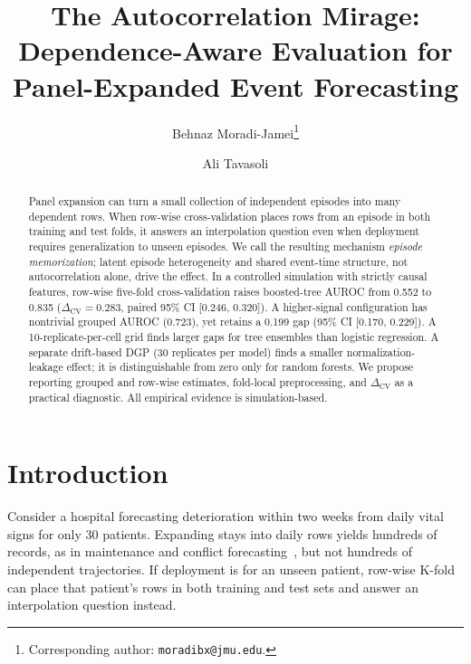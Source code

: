 \documentclass[runningheads]{llncs}
\newcommand{\1}{\mathbf{1}}
\newcommand{\DeltaCV}{\Delta_{\text{CV}}}
\begin{document}
\title{The Autocorrelation Mirage: Dependence-Aware Evaluation for Panel-Expanded Event Forecasting}

\author{Behnaz Moradi-Jamei\thanks{Corresponding author: \texttt{moradibx@jmu.edu}.} \and Ali Tavasoli}

\maketitle

\begin{abstract}
Panel expansion can turn a small collection of independent episodes into many dependent rows. When row-wise cross-validation places rows from an episode in both training and test folds, it answers an interpolation question even when deployment requires generalization to unseen episodes. We call the resulting mechanism \emph{episode memorization}; latent episode heterogeneity and shared event-time structure, not autocorrelation alone, drive the effect. In a controlled simulation with strictly causal features, row-wise five-fold cross-validation raises boosted-tree AUROC from 0.552 to 0.835 ($\DeltaCV=0.283$, paired 95\% CI [0.246, 0.320]). A higher-signal configuration has nontrivial grouped AUROC (0.723), yet retains a 0.199 gap (95\% CI [0.170, 0.229]). A 10-replicate-per-cell grid finds larger gaps for tree ensembles than logistic regression. A separate drift-based DGP (30 replicates per model) finds a smaller normalization-leakage effect; it is distinguishable from zero only for random forests. We propose reporting grouped and row-wise estimates, fold-local preprocessing, and $\DeltaCV$ as a practical diagnostic. All empirical evidence is simulation-based.

\end{abstract}

\section{Introduction}

Consider a hospital forecasting deterioration within two weeks from daily vital signs for only 30 patients. Expanding stays into daily rows yields hundreds of records, as in maintenance and conflict forecasting~\cite{hegre2019,muchlinski2016}, but not hundreds of independent trajectories. If deployment is for an unseen patient, row-wise K-fold can place that patient's rows in both training and test sets and answer an interpolation question instead.
\end{document}
